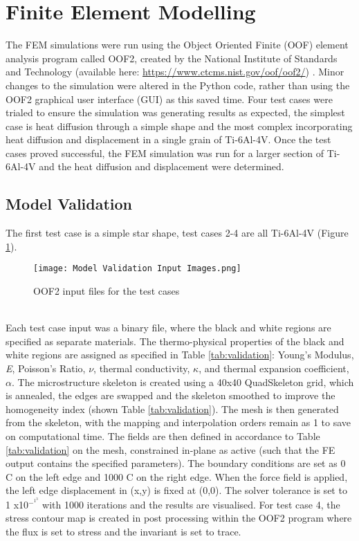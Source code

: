 \documentclass[report.tex]{subfiles}
\begin{document}
\section{Finite Element Modelling}
The FEM simulations were run using the Object Oriented Finite (OOF) element analysis program called OOF2, created by the National Institute of Standards and Technology (available here: \url{https://www.ctcms.nist.gov/oof/oof2/}) \cite{OOF2Modelling}. Minor changes to the simulation were altered in the Python code, rather than using the OOF2 graphical user interface (GUI) as this saved time. Four test cases were trialed to ensure the simulation was generating results as expected, the simplest case is heat diffusion through a simple shape and the most complex incorporating heat diffusion and displacement in a single grain of Ti-6Al-4V. Once the test cases proved successful, the FEM simulation was run for a larger section of Ti-6Al-4V and the heat diffusion and displacement were determined.

\subsection{Model Validation}
The first test case is a simple star shape, test cases 2-4 are all Ti-6Al-4V (Figure \ref{fig:OOF2Input}).
\\
\begin{figure}[h]
    \centering
    \texttt{[image: Model Validation Input Images.png]}
    \caption{OOF2 input files for the test cases}
    \label{fig:OOF2Input}
\end{figure}
\\
Each test case input was a binary file, where the black and white regions are specified as separate materials. The thermo-physical properties of the black and white regions are assigned as specified in Table \ref{tab:validation}: Young's Modulus, \textit{E}, Poisson's Ratio, $\nu$, thermal conductivity, $\kappa$, and thermal expansion coefficient, $\alpha$. The microstructure skeleton is created using a 40x40 QuadSkeleton grid, which is annealed, the edges are swapped and the skeleton smoothed to improve the homogeneity index (shown Table \ref{tab:validation}). The mesh is then generated from the skeleton, with the mapping and interpolation orders remain as 1 to save on computational time. The fields are then defined in accordance to Table \ref{tab:validation} on the mesh, constrained in-plane as active (such that the FE output contains the specified parameters). The boundary conditions are set as 0 \degree C on the left edge and 1000 \degree C on the right edge. When the force field is applied, the left edge displacement in (x,y) is fixed at (0,0). The solver tolerance is set to 1 x10$^-^1^3$ with 1000 iterations and the results are visualised. For test case 4, the stress contour map is created in post processing within the OOF2 program where the flux is set to stress and the invariant is set to trace.
\end{document}
